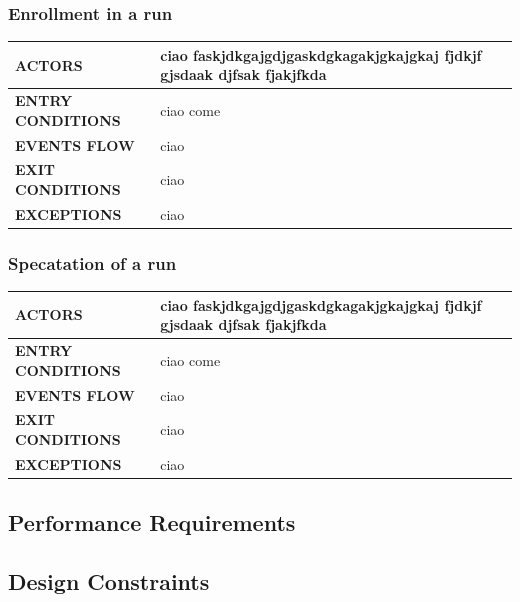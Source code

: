 \documentclass[a4paper]{article}
\begin{document}
    \vspace{1cm}
    
    \subsubsection{Enrollment in a run}
    \begin{center}
        \begin{tabular}{l || p{8cm} ||}
            \bf{ACTORS} & ciao faskjdkgajgdjgaskdgkagakjgkajgkaj fjdkjf gjsdaak djfsak fjakjfkda \\ \hline
            \bf{ENTRY CONDITIONS} & ciao come  \\ \hline
            \bf{EVENTS FLOW} & ciao\\ \hline
            \bf{EXIT CONDITIONS} & ciao\\ \hline
            \bf{EXCEPTIONS} & ciao\\ \hline \hline
        \end{tabular}
    \end{center}
    
    \vspace{1cm}
    
    \subsubsection{Specatation of a run}
    \begin{center}
        \begin{tabular}{l || p{8cm} ||}
            \bf{ACTORS} & ciao faskjdkgajgdjgaskdgkagakjgkajgkaj fjdkjf gjsdaak djfsak fjakjfkda \\ \hline
            \bf{ENTRY CONDITIONS} & ciao come  \\ \hline
            \bf{EVENTS FLOW} & ciao\\ \hline
            \bf{EXIT CONDITIONS} & ciao\\ \hline
            \bf{EXCEPTIONS} & ciao\\ \hline \hline
        \end{tabular}
    \end{center}
    
    \subsection{Performance Requirements}
    
    \subsection{Design Constraints}
    
\end{document}
